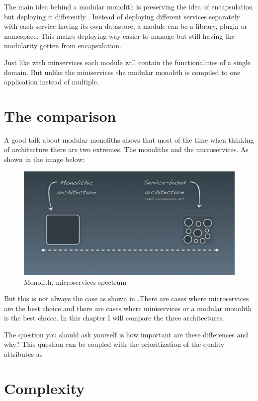 The main idea behind a modular monolith is preserving the idea of encapsulation but deploying it differently \cite{modularMonolithIdea}. Instead of deploying different services separately with each service having its own datastore, a module can be a library, plugin or namespace. This makes deploying way easier to manage but still having the modularity gotten from encapsulation.

Just like with minservices each module will contain the functionalities of a single domain. But unlike the miniservices the modular monolith is compiled to one application instead of multiple.

\section{The comparison}
\label{sec:Comparison}

A good talk about modular monoliths \cite{modularMonolithTalk} shows that most of the time when thinking of architecture there are two extremes. The monoliths and the microservices. As shown in the image below:
\begin{figure}[H]
	\includegraphics[width=\linewidth]{microservices-spectrum.png}
	\caption{Monolith, microservices spectrum \cite{modularMonolithTalk}}
\end{figure}

But this is not always the case as shown in .There are cases where microservices are the best choice and there are cases where miniservices or a modular monolith is the best choice. In this chapter I will compare the three architectures.

The question you should ask yourself is how important are these differences and why? This question can be coupled with the prioritization of the quality attributes as 

\section{Complexity}
\label{sec:Complexity}

